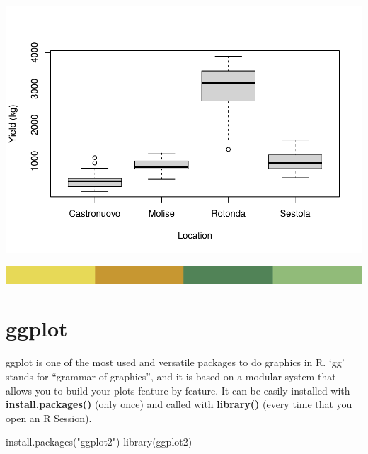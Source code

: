 \documentclass[
]{book}
\newenvironment{Shaded}{\begin{snugshade}}{\end{snugshade}}
\newcommand{\AttributeTok}[1]{\textcolor[rgb]{0.77,0.63,0.00}{#1}}
\newcommand{\FunctionTok}[1]{\textcolor[rgb]{0.00,0.00,0.00}{#1}}
\newcommand{\NormalTok}[1]{#1}
\newcommand{\SpecialCharTok}[1]{\textcolor[rgb]{0.00,0.00,0.00}{#1}}
\newcommand{\StringTok}[1]{\textcolor[rgb]{0.31,0.60,0.02}{#1}}
\begin{document}
\begin{Shaded}
\end{Shaded}

\includegraphics[width=1.5\linewidth]{PPB-Toolkit-for-R-and-R-Studio_files/figure-latex/unnamed-chunk-63-1}

\includegraphics{rsrstrip.png}

\hypertarget{ggplot}{%
\section{ggplot}\label{ggplot}}

ggplot is one of the most used and versatile packages to do graphics in R. `gg' stands for ``grammar of graphics'', and it is based on a modular system that allows you to build your plots feature by feature. It can be easily installed with \textbf{install.packages() } (only once) and called with \textbf{library() } (every time that you open an R Session).

\begin{Shaded}
\begin{Highlighting}[]
\FunctionTok{install.packages}\NormalTok{(}\StringTok{"ggplot2"}\NormalTok{)}
\FunctionTok{library}\NormalTok{(ggplot2)}
\end{Highlighting}
\end{Shaded}
\end{document}
